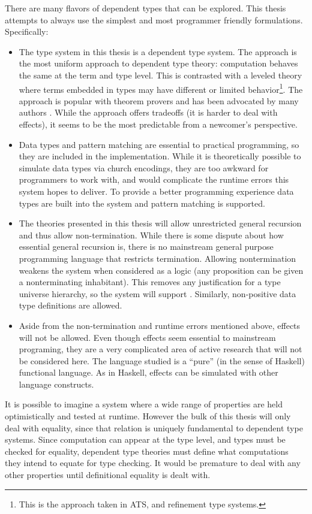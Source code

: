 There are many flavors of dependent types that can be explored.
This thesis attempts to always use the simplest and most programmer friendly formulations.
Specifically:
\begin{itemize}
\item The type system in this thesis is a \textbf{\fullSp{}} dependent type system.
The \fullSp{} approach is the most uniform approach to dependent type theory: computation behaves the same at the term and type level.
This is contrasted with a leveled theory where terms embedded in types may have different or limited behavior\footnote{
  This is the approach taken in ATS, and refinement type systems.
}.
The \fullSp{} approach is popular with theorem provers and has been advocated by many authors \cite{10.1145/289423.289451,norell2007towards,brady2013idris,sjoberg2012irrelevance}.
While the \fullSp{} approach offers tradeoffs (it is harder to deal with effects), it seems to be the most predictable from a newcomer's perspective.
\item Data types and pattern matching are essential to practical programming, so they are included in the implementation.
While it is theoretically possible to simulate data types via church encodings, they are too awkward for programmers to work with, and would complicate the runtime errors this system hopes to deliver.
To provide a better programming experience data types are built into the system and pattern matching is supported.
\item The theories presented in this thesis will allow unrestricted general recursion and thus allow non-termination.
While there is some dispute about how essential general recursion is,
there is no mainstream general purpose programming language that restricts termination.
Allowing nontermination weakens the system when considered as a logic (any proposition can be given a nonterminating inhabitant).
This removes any justification for a type universe hierarchy, so the system will support \tit{}.
Similarly, non-positive data type definitions are allowed.
\item Aside from the non-termination and runtime errors mentioned above, effects will not be allowed.
Even though effects seem essential to mainstream programing, they are a very complicated area of active research that will not be considered here.
The language studied is a ``pure'' (in the sense of Haskell) functional language.
As in Haskell, effects can be simulated with other language constructs.
\end{itemize}
It is possible to imagine a system where a wide range of properties are held optimistically and tested at runtime.
However the bulk of this thesis will only deal with equality, since that relation is uniquely fundamental to dependent type systems.
Since computation can appear at the type level, and types must be checked for equality, dependent type theories must define what computations they intend to equate for type checking.
It would be premature to deal with any other properties until definitional equality is dealt with.

